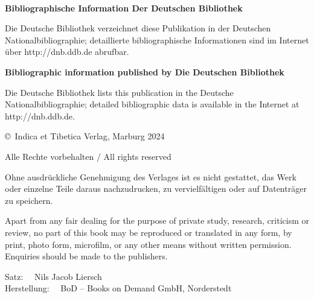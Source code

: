 \noindent

\
\vfill


\small
\noindent \textbf{Bibliographische Information Der Deutschen Bibliothek}

\noindent
Die Deutsche Bibliothek verzeichnet diese Publikation in der Deutschen Nationalbibliographie;
detaillierte bibliographische Informationen sind im Internet über http://dnb.ddb.de abrufbar.

\noindent
\textbf{Bibliographic information published by Die Deutschen Bibliothek}

\noindent
Die Deutsche Bibliothek lists this publication in the Deutsche Nationalbibliographie; detailed
bibliographic data is available in the Internet at http://dnb.ddb.de.  


\vskip 1cm

\noindent
\copyright\ Indica et Tibetica Verlag, Marburg 2024

\medskip

\noindent
Alle Rechte vorbehalten / All rights reserved

\medskip

\noindent
Ohne ausdrückliche Genehmigung des Verlages ist es nicht gestattet, das Werk oder einzelne Teile
daraus nachzudrucken, zu vervielfältigen oder auf Datenträger zu speichern.

\smallskip

\noindent
Apart from any fair dealing for the purpose of private study, research, criticism or review, no
part of this book may be reproduced or translated in any form, by print, photo form, microfilm, or
any other means without written permission. Enquiries should be made to the publishers.

\bigskip

\noindent
Satz: \ \ Nils Jacob Liersch \\
Herstellung: \ \ BoD – Books on Demand GmbH, Norderstedt  \\

\bigskip

\noindent

\normalsize

\newpage

\clearpage
\tableofcontents
\addtocounter{page}{-1}
\thispagestyle{empty}
\clearpage


\mainmatter

